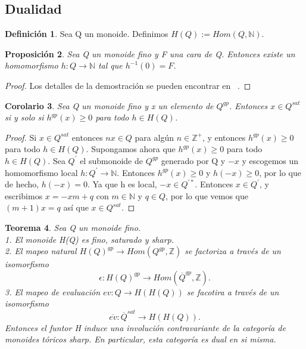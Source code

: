 \documentclass[12pt,spanish]{amsart}
\newcommand{\bb}[1]{\mathbb{#1}}
\newtheorem{Theorem}{Teorema}[section]
\newtheorem{prop}[Theorem]{Proposición}
\newtheorem{cor}[Theorem]{Corolario}
\theoremstyle{definition}
\newtheorem{Def}[Theorem]{Definición}
\theoremstyle{remark}
\begin{document}
\subsection{Dualidad}

\begin{Def}
Sea Q un monoide. Definimos $H(Q):=Hom(Q,\bb{N})$.
\end{Def}

\begin{prop}
Sea Q un monoide fino y F una cara de Q. Entonces existe un homomorfismo $h:Q \to \bb{N}$ tal que $h^{-1}(0)=F$.  
\end{prop}

\begin{proof}
Los detalles de la demostración se pueden encontrar en ~\cite{Ogus:2018aa}. 
\end{proof}

\begin{cor}
Sea Q un monoide fino y x un elemento de $Q^{gp}$. Entonces $x\in Q^{sat}$ si y solo si $h^{gp}(x)\geq 0$ para todo $h\in H(Q)$. 
\end{cor}

\begin{proof}
Si $x\in Q^{sat}$ entonces $nx\in Q$ para algún $n\in \bb{Z}^{+}$, y entonces $h^{gp}(x)\geq 0$ para todo $h\in H(Q)$. Supongamos ahora que $h^{gp}(x)\geq 0$ para todo $h\in H(Q)$. Sea $Q^{\prime}$ el submonoide de $Q^{gp}$ generado por Q y $-x$ y escogemos un homomorfismo local $h:Q^{\prime} \to \bb{N}$. Entonces $h^{gp}(x)\geq 0$ y $h(-x)\geq 0$, por lo que de hecho, $h(-x)=0$. Ya que h es local, $-x \in Q^{\prime \ast}$. Entonces $x\in Q^{\prime}$, y escribimos $x=-xm+q$ con $m\in \bb{N}$ y $q\in Q$, por lo que vemos que $(m+1)x=q$ así que $x\in Q^{sat}$.  
\end{proof}


\begin{Theorem}
Sea Q un monoide fino. \\
1. El monoide H(Q) es fino, saturado y \textit{sharp}. \\
2. El mapeo natural $H(Q)^{gp} \to Hom(Q^{gp},\bb{Z})$ se factoriza a través de un isomorfismo
$$\epsilon:H(Q)^{gp} \to Hom(\overline{Q}^{gp},\bb{Z}).$$
3. El mapeo de evaluación $ev: Q \to H(H(Q))$ se facotira a través de un isomorfismo 
$$\overline{ev}:\overline{Q}^{sat} \to H(H(Q)).$$
Entonces el funtor H induce una involución contravariante de la categoría de monoides tóricos \textit{sharp}. En particular, esta categoría es dual en si misma.  
\end{Theorem}
\end{document}
